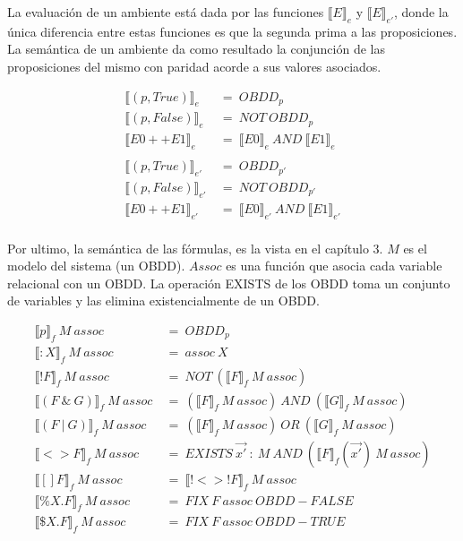 \noindent La evaluación de un ambiente está dada por las funciones $\llbracket E \rrbracket _{e}$ y $\llbracket E \rrbracket _{e'}$, donde la única diferencia entre estas funciones es que la segunda prima a las proposiciones. La semántica de un ambiente da como resultado la conjunción de las proposiciones del mismo con paridad acorde a sus valores asociados.

\begin{align*}
\llbracket (p,True) \rrbracket _{e}\ &=\ OBDD_{p} \\
\llbracket (p,False) \rrbracket _{e}\ &=\ NOT\ OBDD_{p} \\
\llbracket E0++E1 \rrbracket _{e}\ &=\ \llbracket E0 \rrbracket _{e}\ AND\ \llbracket E1 \rrbracket _{e} \\
\\
\llbracket (p,True) \rrbracket _{e'}\ &=\ OBDD_{p'} \\
\llbracket (p,False) \rrbracket _{e'}\ &=\ NOT\ OBDD_{p'} \\
\llbracket E0++E1 \rrbracket _{e'}\ &=\ \llbracket E0 \rrbracket _{e'}\ AND\ \llbracket E1 \rrbracket _{e'} \\
\end{align*}

\noindent Por ultimo, la semántica de las fórmulas, es la vista en el capítulo 3. $M$ es el modelo del sistema (un OBDD). $Assoc$ es una función que asocia cada variable relacional con un OBDD. La operación EXISTS de los OBDD toma un conjunto de variables y las elimina existencialmente de un OBDD.

\begin{align*}
\llbracket p \rrbracket _{f}\ M\ assoc\ &=\ OBDD_{p} \\
\llbracket :X \rrbracket _{f}\ M\ assoc\ &=\ assoc\ X \\
\llbracket !F \rrbracket _{f}\ M\ assoc\ &=\ NOT\ (\llbracket F \rrbracket _{f}\ M\ assoc)\\
\llbracket (F\ \&\ G) \rrbracket _{f}\ M\ assoc\ &=\ (\llbracket F \rrbracket _{f}\ M\ assoc)\ AND\ (\llbracket G \rrbracket _{f}\ M\ assoc)\\
\llbracket (F\ |\ G) \rrbracket _{f}\ M\ assoc\ &=\ (\llbracket F \rrbracket _{f}\ M\ assoc)\ OR\ (\llbracket G \rrbracket _{f}\ M\ assoc)\\
\llbracket <>F \rrbracket _{f}\ M\ assoc\ &=\ EXISTS\ \vec {x'}\ :\ M\ AND\ (\llbracket F \rrbracket _{f}(\vec {x'})\ M\ assoc) \\
\llbracket []F \rrbracket _{f}\ M\ assoc\ &=\ \llbracket !<>!F \rrbracket _{f}\ M\ assoc \\
\llbracket \%X.F \rrbracket _{f}\ M\ assoc\ &=\ FIX\ F\ assoc\ OBDD-FALSE \\
\llbracket \$X.F \rrbracket _{f}\ M\ assoc\ &=\ FIX\ F\ assoc\ OBDD-TRUE \\
\end{align*}

